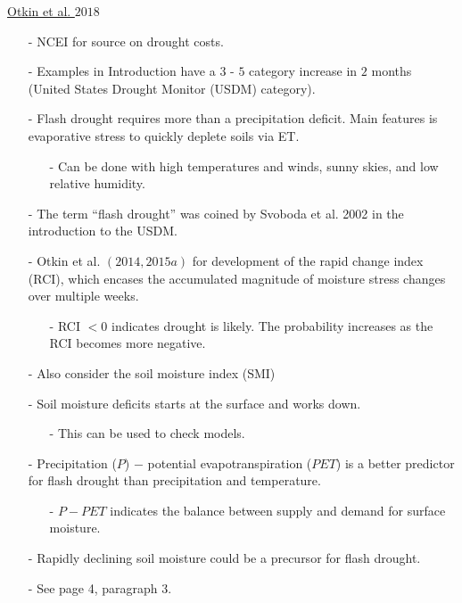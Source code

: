 \documentclass[12pt, letterpaper]{article}
\begin{document}
	\underline{Otkin et al. $2018$}
	\begin{itemize}
		\item[-] NCEI for source on drought costs.
		\item[-] Examples in Introduction have a $3$ - $5$ category increase in $2$ months
		         (United States Drought Monitor (USDM) category).
		\item[-] Flash drought requires more than a precipitation deficit. Main features is evaporative 
		         stress to quickly deplete soils via ET.
		\begin{itemize}
			\item[-] Can be done with high temperatures and winds, sunny skies, and low relative humidity.
		\end{itemize}
	    \item[-] The term ``flash drought'' was coined by Svoboda et al. 2002 in the introduction to
	             the USDM.
	    \item[-] Otkin et al. $(2014, 2015a)$ for development of the  rapid change index (RCI),
	             which encases the accumulated magnitude of moisture stress changes over multiple weeks.
	    \begin{itemize}
	    	\item[-] RCI $< 0$ indicates drought is likely. The probability increases as the RCI
	    	         becomes more negative. 
	    \end{itemize}
        \item[-] Also consider the soil moisture index (SMI)
        \item[-] Soil moisture deficits starts at the surface and works down.
        \begin{itemize}
        	\item[-] This can be used to check models.
        \end{itemize}
        \item[-] Precipitation ($P$) $-$ potential evapotranspiration ($PET$) is a better predictor for
                 flash drought than precipitation and temperature.
        \begin{itemize}
        	\item[-] $P - PET$ indicates the balance between supply and demand for surface moisture.
        \end{itemize}
        \item[-] Rapidly declining soil moisture could be a precursor for flash drought.
        \item[-] See page 4, paragraph 3.

\end{itemize}
\end{document}
